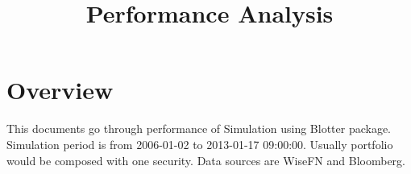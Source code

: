 \documentclass{article}
\begin{document}




\title{Performance Analysis}
\author{}
\date{}

\maketitle


\section{Overview}
This documents go through performance of Simulation using Blotter package. Simulation period is from 2006-01-02 to 2013-01-17 09:00:00. Usually portfolio would be composed with one security. Data sources are WiseFN and Bloomberg.
\end{document}
